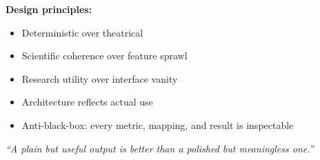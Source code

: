 \documentclass[11pt, letterpaper, oneside]{report}
\begin{document}
\vspace{1cm}

\noindent\textbf{Design principles:}
\begin{itemize}
\item Deterministic over theatrical
\item Scientific coherence over feature sprawl
\item Research utility over interface vanity
\item Architecture reflects actual use
\item Anti-black-box: every metric, mapping, and result is inspectable
\end{itemize}

\vspace{1cm}

\begin{center}
\textit{``A plain but useful output is better than a polished but meaningless one.''}
\end{center}
\end{document}
